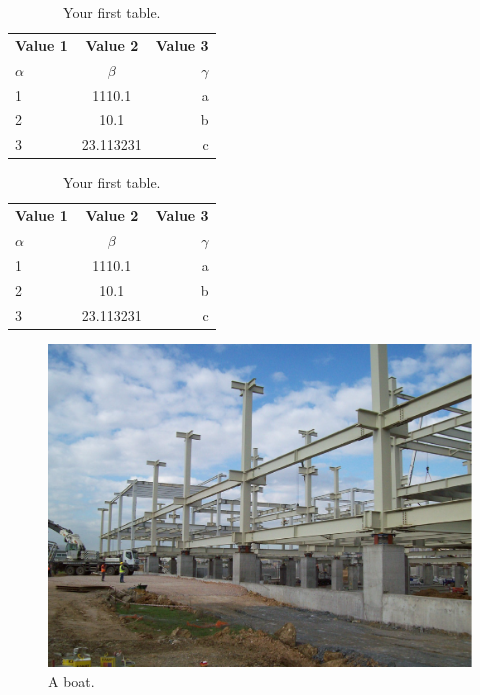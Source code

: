 \documentclass[english]{eqconf}
\begin{document}
\blindtext

\blindtext

\blindtext

\blindtext

\blindtext \blindtext \blindtext \blindtext

\begin{table}[]
	\setlength\abovecaptionskip{0pt}
	\setlength\belowcaptionskip{15pt}
	\centering
		\caption{Your first table.}
		\label{tab:table1}
		\begin{tabular}{l|c|r} %
			\textbf{Value 1} & \textbf{Value 2} & \textbf{Value 3}\\
			$\alpha$ & $\beta$ & $\gamma$ \\
			\hline
			1 & 1110.1 & a\\
			2 & 10.1 & b\\
			3 & 23.113231 & c\\
		\end{tabular}
\end{table}

\blindtext

\blindtext

\begin{table}
	\setlength\abovecaptionskip{0pt}
	\setlength\belowcaptionskip{15pt}
	\vspace{-12pt}
	\centering
	\caption{Your first table.}
	\label{tab:table1}
	\begin{tabular}{l|c|r} %
		\textbf{Value 1} & \textbf{Value 2} & \textbf{Value 3}\\
		$\alpha$ & $\beta$ & $\gamma$ \\
		\hline
		1 & 1110.1 & a\\
		2 & 10.1 & b\\
		3 & 23.113231 & c\\
	\end{tabular}
\end{table}

\blindtext

\blindtext

\begin{figure}[h]
	\centering
	\includegraphics[scale=0.4]{b.PNG}
	\caption{A boat.}
	\label{fig:boat1}
\end{figure}

\blindtext

\blindtext
\end{document}
